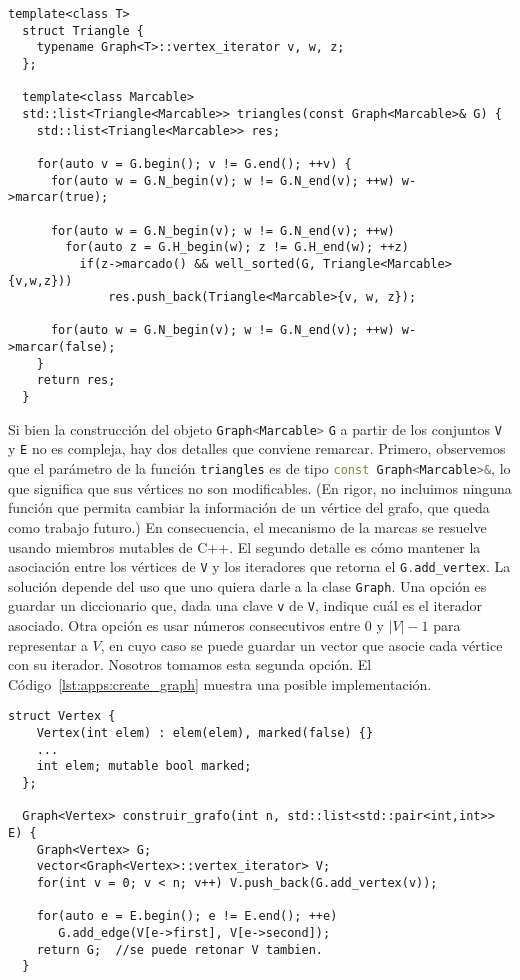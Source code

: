 \documentclass[%
    a4paper,%
    fontsize=12pt,%
    DIV=12,
    twoside,%
    openright,%
    titlepage=true,%
    headsepline,%
    toc=bibliography,%
    parskip=half,%
    cleardoublepage=empty,%
    headings=big,%
]{scrbook}
\makeatletter
\newcommand{\CPPCode}[2][]{\lstinline[language=C++,basicstyle={\ttfamily},#1]@#2@}
\DeclareRobustCommand{\CPP}{C\nolinebreak[4]\hspace{-.05em}\raisebox{.4ex}{\relsize{-3}\textbf{++}}\xspace}
\def\CPP{C++}%
\makeatother
\begin{document}
\def\lstlistingname{Código}
\begin{lstlisting}[caption={Algoritmo de búsqueda de triángulos usando la clase \CPPCode{Graph}.},gobble=2,float=ht,label={lst:apps:triangulos}]
  template<class T>
  struct Triangle {
    typename Graph<T>::vertex_iterator v, w, z;
  };

  template<class Marcable>
  std::list<Triangle<Marcable>> triangles(const Graph<Marcable>& G) {
    std::list<Triangle<Marcable>> res;

    for(auto v = G.begin(); v != G.end(); ++v) {
      for(auto w = G.N_begin(v); w != G.N_end(v); ++w) w->marcar(true);

      for(auto w = G.N_begin(v); w != G.N_end(v); ++w)
        for(auto z = G.H_begin(w); z != G.H_end(w); ++z)
          if(z->marcado() && well_sorted(G, Triangle<Marcable>{v,w,z}))
              res.push_back(Triangle<Marcable>{v, w, z});
      
      for(auto w = G.N_begin(v); w != G.N_end(v); ++w) w->marcar(false);
    }
    return res;
  }
\end{lstlisting}

Si bien la construcción del objeto \CPPCode{Graph<Marcable>} \CPPCode{G} a partir de los conjuntos \CPPCode{V} y \CPPCode{E} no es compleja, hay dos detalles que conviene remarcar.  Primero, observemos que el parámetro de la función \CPPCode{triangles} es de tipo \CPPCode{const Graph<Marcable>&}, lo que significa que sus vértices no son modificables.  (En rigor, no incluimos ninguna función que permita cambiar la información de un vértice del grafo, que queda como trabajo futuro.)  En consecuencia, el mecanismo de la marcas se resuelve usando miembros mutables de \CPP.  El segundo detalle es cómo mantener la asociación entre los vértices de \CPPCode{V} y los iteradores que retorna el \CPPCode{G.add_vertex}.  La solución depende del uso que uno quiera darle a la clase \CPPCode{Graph}.  Una opción es guardar un diccionario que, dada una clave \CPPCode{v} de \CPPCode{V}, indique cuál es el iterador asociado.  Otra opción es usar números consecutivos entre $0$ y $|V|-1$ para representar a $V$, en cuyo caso se puede guardar un vector que asocie cada vértice con su iterador.  Nosotros tomamos esta segunda opción.  El Código~\ref{lst:apps:create_graph} muestra una posible implementación.


\begin{lstlisting}[caption={Una posible implementación de \CPPCode{construir_grafo}.},gobble=2,float=ht,label={lst:apps:create_graph}]
  struct Vertex {
    Vertex(int elem) : elem(elem), marked(false) {}
    ...
    int elem; mutable bool marked;
  };

  Graph<Vertex> construir_grafo(int n, std::list<std::pair<int,int>> E) {
    Graph<Vertex> G;
    vector<Graph<Vertex>::vertex_iterator> V;
    for(int v = 0; v < n; v++) V.push_back(G.add_vertex(v));

    for(auto e = E.begin(); e != E.end(); ++e)
       G.add_edge(V[e->first], V[e->second]);
    return G;  //se puede retonar V tambien.
  }
\end{lstlisting}
\end{document}
